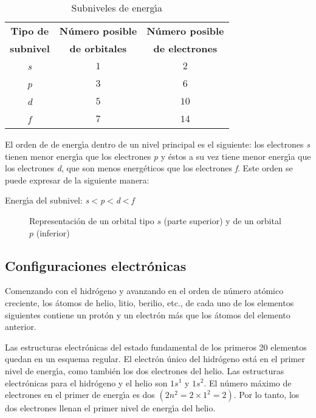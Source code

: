 \begin{table}[hbt]
\caption{Subniveles de energ\'{\i}a}
\label{tabla3.2}
\begin{center}
\begin{tabular}{ccc}\hline
\textbf{Tipo de} & \textbf{N\'umero posible}& \textbf{N\'umero posible}\\
\textbf{subnivel}& \textbf{de orbitales}  &\textbf{de electrones}\\\hline
\textit{s}&$1$&$2$\\
\textit{p}&$3$&$6$\\
\textit{d}&$5$&$10$\\
\textit{f}&$7$&$14$\\\hline
\end{tabular}
\end{center}
\end{table} 
El orden de de energ\'{\i}a dentro de un nivel principal es el si\-gui\-en\-te:  los electrones \textit{s} tienen menor energ\'{\i}a que los electrones \textit{p}
 y \'estos a su vez tiene menor energ\'{\i}a que los electrones \textit{d}, que son menos energ\'eticos que los electrones \textit{f}. Este orden se puede
expresar de la siguiente manera:
\begin{center}
Energ\'{\i}a del subnivel: \textit{s}$<$\textit{p}$<$\textit{d}$<$\textit{f}

\begin{figure}
\hspace{4cm}
\vglue 0.2in
\hspace{1.5cm}
\caption[Orbitales $s$ y$p$]{Representaci\'on de un orbital tipo $s$ (parte superior)
y de un orbital $p$ (inferior)}
\label{fig3:1}
\end{figure}
\end{center}

\subsection{Configuraciones electr\'onicas}
Comenzando con el hidr\'ogeno y avanzando en el orden de n\'umero at\'o\-mi\-co
creciente, los \'atomos de helio, litio, berilio, etc., de cada uno de los elementos siguientes contiene un prot\'on y un electr\'on m\'as que los \'atomos
del elemento anterior.

Las estructuras electr\'onicas  del  estado fundamental de los primeros 20 elementos quedan en un esquema regular. El
electr\'on \'unico del hidr\'ogeno est\'a en el primer nivel de energ\'{\i}a, como tambi\'en los dos electrones del helio. Las estructuras electr\'onicas para el
hidr\'ogeno y el helio son $1s^1$ y $1s^2$. El n\'umero m\'aximo de electrones en el primer de energ\'{\i}a es dos $(2n^2 = 2 \times 1^2 = 2)$. Por lo tanto, los dos
electrones llenan el primer nivel de energ\'{\i}a del helio.


